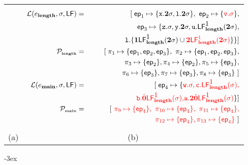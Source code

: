 \documentclass[9pt]{sigplanconf}
\newcommand{\cred}[1]{{\color{red}{#1}}}
\begin{document}
\begin{figure*}[t!]
\begin{tabular}{cc}
    &

    \begin{minipage}{.51\textwidth}

        \small
\begin{eqnarray*}
        \mathcal{L}(e_{\length},\sigma,\Lfonly) &=&
              [\;\epath_1 \mapsto \lbrace \px.\clazy \sigma,
\xl.\clazy\sigma\rbrace ,~\epath_2 \mapsto \lbrace \cred{
\pv.\sigma}  \rbrace,\\
 &&          \;\;  \epath_3 \mapsto \lbrace \pz.\sigma,
                \py.\clazy\sigma,
\pu.\Lf{\length}{\mbox{1}}{\clazy\sigma},\\
&&            \;\;\;\;\;\;\;\;\;\;\;\;\;\;\;\;\;
\xl.\{ \acdr\Lf{\length}{\mbox{1}}{\clazy\sigma} \cup
\cred{\clazy\Lf{\length}{1}{\clazy\sigma}}\}\}
             \rbrack \\
            \cal{P_{\mbox{\tiny \length}}} &=&
                [\;\pi_1 \mapsto \lbrace \epath_1, \epath_2, \epath_3 \rbrace,  \
                 \pi_2 \mapsto \lbrace \epath_1, \epath_2, \epath_3
                  \rbrace, \\
&&\;\;  \pi_3 \mapsto \lbrace \epath_2
                  \rbrace ,  \pi_4 \mapsto \lbrace \epath_2
                  \rbrace, \pi_5 \mapsto \lbrace  \epath_3 \rbrace, \\
 &&  \;\;                        \pi_6 \mapsto \lbrace \epath_3 \rbrace,
\pi_7 \mapsto
                   \lbrace \epath_3\rbrace, \pi_8 \mapsto \lbrace \epath_3
\rbrace~\rbrack\\
              \mathcal{L}(e_{\main},\sigma,\Lfonly) &=&
                [\;
                  \epath_4 \mapsto \lbrace \cred {\pw.\sigma,
                                       \pc.\Lf{\length}{\mbox{1}}{\sigma},}\\
&& \;\;\;\;\;\;\;\;\;\;\;\;\;\;\;\;\;\;
\cred{\pb.\bcar\Lf{\length}{\mbox{1}}{\sigma},}
\cred{\pa.\clazy\bcar\Lf{\length}{\mbox{1}}{\sigma}} \rbrace
                               ] \\
               \cal{P_{\mbox{\tiny \main}}} &=&
                  \lbrack~ \cred{\pi_9 \mapsto \lbrace \epath_4 \rbrace,  \
                    \pi_{10} \mapsto \lbrace \epath_4 \rbrace,  \
                   \pi_{11} \mapsto \lbrace \epath_4 \rbrace,} \\
                   && \;\; \cred{\pi_{12} \mapsto \lbrace \epath_4 \rbrace,
\pi_{13} \mapsto \lbrace \epath_4 \rbrace}~\rbrack
\end{eqnarray*}
    \end{minipage} \\
(a)&
(b)
  \end{tabular}
\kern -3ex
\caption{(a) Example program and (b) its liveness
maps.}\label{fig:mot-example2}
\end{figure*}
\end{document}
